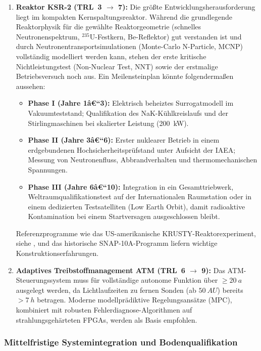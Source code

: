 ﻿\documentclass[a4paper,12pt,twoside]{article}
\theoremstyle{plain}
\theoremstyle{definition}
\theoremstyle{remark}
\begin{document}
\begin{enumerate}
		\item \textbf{Reaktor KSR-2 (TRL~3 $\to$ 7):}
		Die größte Entwicklungsherausforderung liegt im kompakten Kernspaltungsreaktor.
		Während die grundlegende Reaktorphysik für die gewählte Reaktorgeometrie
		(schnelles Neutronenspektrum, $^{235}$U-Festkern, Be-Reflektor) gut verstanden
		ist und durch Neutronentransportsimulationen (Monte-Carlo N-Particle, MCNP)
		vollständig modelliert werden kann, stehen der erste kritische Nichtleistungstest
		(Non-Nuclear Test, NNT) sowie der erstmalige Betriebsversuch noch aus. Ein
		Meilensteinplan könnte folgendermaßen aussehen:
		\begin{itemize}
			\item \textbf{Phase I (Jahre 1â€“3):} Elektrisch beheiztes Surrogatmodell im
			Vakuumteststand; Qualifikation des NaK-Kühlkreislaufs und der Stirlingmaschinen
			bei skalierter Leistung (\SI{200}{kW}).
			\item \textbf{Phase II (Jahre 3â€“6):} Erster nuklearer Betrieb in einem
			erdgebundenen Hochsicherheitsprüfstand unter Aufsicht der IAEA; Messung von
			Neutronenfluss, Abbrandverhalten und thermomechanischen Spannungen.
			\item \textbf{Phase III (Jahre 6â€“10):} Integration in ein Gesamttriebwerk,
			Weltraumqualifikationstest auf der Internationalen Raumstation oder in einem
			dedizierten Testsatelliten (Low Earth Orbit), damit radioaktive Kontamination
			bei einem Startversagen ausgeschlossen bleibt.
		\end{itemize}
		Referenzprogramme wie das US-amerikanische KRUSTY-Reaktorexperiment, siehe 
		\cite{dewar2004}, und das historische SNAP-10A-Programm liefern wichtige
		Konstruktionserfahrungen.

		\item \textbf{Adaptives Treibstoffmanagement ATM (TRL~6 $\to$ 9):}
		Das ATM-Steuerungs\-system muss für vollständige autonome Funktion über
		$\geq\SI{20}{a}$ ausgelegt werden, da Lichtlaufzeiten zu fernen Sonden
		(ab $\SI{50}{AU}$) bereits $>\SI{7}{h}$ betragen. Moderne modellprädiktive
		Regelungsansätze (MPC), kombiniert mit robusten Fehlerdiagnose-Algorithmen
		auf strahlungsgehärteten FPGAs, werden als Basis empfohlen.
	\end{enumerate}

	\subsubsection{Mittelfristige Systemintegration und Bodenqualifikation}
\end{document}
